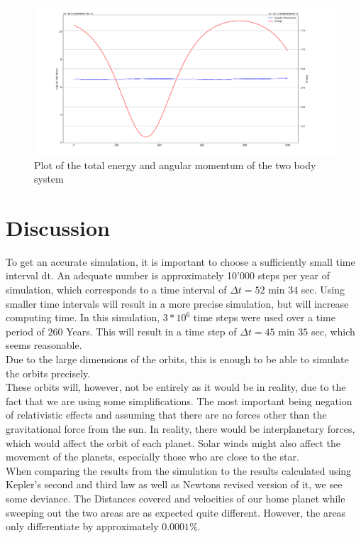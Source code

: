 \documentclass[reprint,english,notitlepage]{revtex4-2}
\begin{document}
	\begin{figure}[h!]
	  \centering
	  \includegraphics[scale = 0.15]{Figures/Energy_AngularMomentum_plot}
	  \caption{Plot of the total energy and angular momentum of the two body system}
	  \label{fig: tot_Energy_AM}
	\end{figure}
	

\section{Discussion}
To get an accurate simulation, it is important to choose a sufficiently small time interval dt.
An adequate number is approximately 10'000 steps per year of simulation, which corresponds to a time interval of $\Delta t = 52$ min $34$ sec.
Using smaller time intervals will result in a more precise simulation, but will increase computing time.
In this simulation, $3*10^6$ time steps were used over a time period of $260$ Years.
This will result in a time step of $\Delta t = 45$ min $35$ sec, which seems reasonable.\\
Due to the large dimensions of the orbits, this is enough to be able to simulate the orbits precisely.\\
These orbits will, however, not be entirely as it would be in reality, due to the fact that we are using some simplifications.
The most important being negation of relativistic effects and assuming that there are no forces other than the gravitational force from the sun.
In reality, there would be interplanetary forces, which would affect the orbit of each planet.
Solar winds might also affect the movement of the planets, especially those who are close to the star.\\
When comparing the results from the simulation to the results calculated using Kepler's second and third law as well as Newtons revised version of it, we see some deviance.
The Distances covered and velocities of our home planet while sweeping out the two areas are as expected quite different.
However, the areas only differentiate by approximately $0.0001\%$.\\
\end{document}
